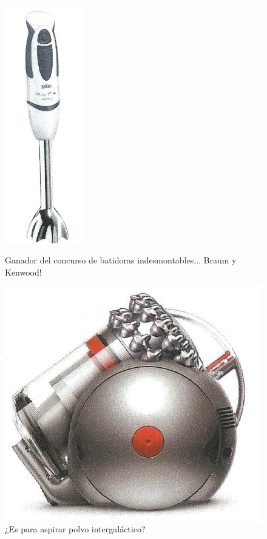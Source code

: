 \documentclass[a5paper,twoside,openany]{book}
\begin{document}
\begin{itemize}
\begin{figure}[h]
    \centering
    \begin{minipage}[b]{0.4\textwidth}
        \centering
        \includegraphics[width=0.3\textwidth]{braum-mixer} 
        \caption*{Ganador del concurso de batidoras indesmontables... Braum y Kenwood!}
    \end{minipage}
    \hfill
    \begin{minipage}[b]{0.4\textwidth}
        \centering
        \includegraphics[width=\textwidth]{Dyson} 
        \caption*{¿Es para aspirar polvo intergaláctico?}
    \end{minipage}
\end{figure}



\end{itemize}
\end{document}
